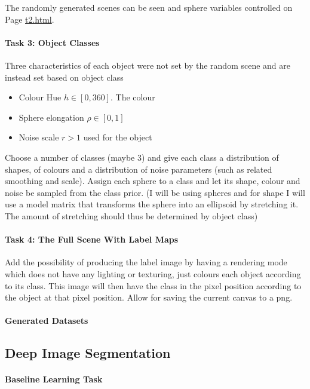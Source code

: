 \documentclass[12pt,fleqn]{article}
\begin{document}
The randomly generated scenes can be seen and sphere variables controlled on Page \href{file:///home/sorenmulli/Nextcloud/cand2/computer-graphics/afl/webgl-site/t2.html}{t2.html}.

\paragraph{Task 3: Object Classes}
Three characteristics of each object were not set by the random scene and are instead set based on object class
\begin{itemize}
    \item Colour Hue $h \in [0, 360]$. The colour 
    \item Sphere elongation $\rho \in [0, 1]$
    \item Noise scale $r > 1$ used for the object
\end{itemize}

Choose a number of classes (maybe 3) and give each class a distribution of shapes, of colours and a distribution of noise parameters (such as related smoothing and scale). Assign each sphere to a class and let its shape, colour and noise be sampled from the class prior. (I will be using spheres and for shape I will use a model matrix that transforms the sphere into an ellipsoid by stretching it. The amount of stretching should thus be determined by object class)
\paragraph{Task 4: The Full Scene With Label Maps}
Add the possibility of producing the label image by having a rendering mode which does not have any lighting or texturing, just colours each object according to its class. This image will then have the class in the pixel position according to the object at that pixel position. Allow for saving the current canvas to a png.
\paragraph{Generated Datasets}


\subsection{Deep Image Segmentation}
\paragraph{Baseline Learning Task}
\end{document}
